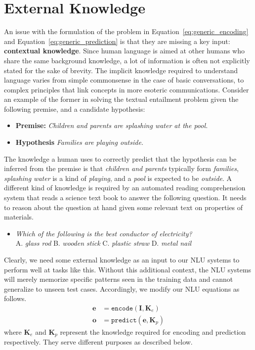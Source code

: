 \section{External Knowledge}
An issue with the formulation of the problem in Equation~\ref{eq:generic_encoding} and Equation~\ref{eq:generic_prediction} is that they are missing a key input: \textbf{contextual knowledge}. 
Since human language is aimed at other humans who share 
the same background knowledge, a lot of information is often not explicitly stated
for the sake of brevity. The implicit knowledge required to understand language varies 
from simple commonsense in the case of basic conversations, to complex principles that link 
concepts in more esoteric communications. Consider an example of the former in solving the 
textual entailment problem given the following premise, and a candidate hypothesis:
\begin{itemize}
 \item \textbf{Premise:} \textit{Children and parents are splashing water at the pool.}
 \item \textbf{Hypothesis} \textit{Families are playing outside.}
\end{itemize}
The knowledge a human uses to correctly predict that the hypothesis can be inferred from the 
premise is that \textit{children and parents} typically form \textit{families}, \textit{splashing water} 
is a kind of \textit{playing}, and a \textit{pool} is expected to be \textit{outside}. A different kind of knowledge 
is required by an  automated reading comprehension system that reads a science text book to answer the following 
question. It needs to reason about the question at hand given some relevant text on properties of materials.
\begin{itemize}
 \item \textit{Which of the following is the best conductor of electricity?}\\ 
  A. \textit{glass rod}  B. \textit{wooden stick}  C. \textit{plastic straw} D. \textit{metal nail}
\end{itemize}

Clearly, we need some external knowledge as an input to our NLU systems to perform well at tasks like this.
Without this additional context, the NLU systems will merely memorize specific patterns seen in the training data
and cannot generalize to unseen test cases. Accordingly, we modify our NLU equations as follows.
\begin{align}
 \mathbf{e} &= \mathtt{encode}(\mathbf{I}, \mathbf{K}_e) \label{eq:encoding_with_knowledge}\\
 \mathbf{o} &= \mathtt{predict}(\mathbf{e}, \mathbf{K}_p) \label{eq:prediction_with_knowledge}
\end{align}
where $\mathbf{K}_e$ and $\mathbf{K}_p$ represent the knowledge required for encoding and prediction respectively. 
They serve different purposes as described below.

